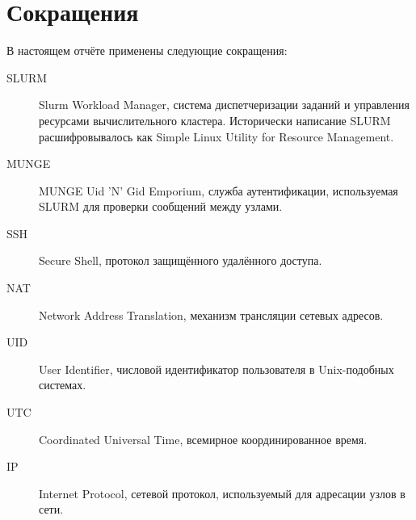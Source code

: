 \section*{Сокращения}

В настоящем отчёте применены следующие сокращения:

\begin{description}
    \item[SLURM] Slurm Workload Manager, система диспетчеризации заданий и управления ресурсами вычислительного кластера. Исторически написание SLURM расшифровывалось как Simple Linux Utility for Resource Management.
    \item[MUNGE] MUNGE Uid 'N' Gid Emporium, служба аутентификации, используемая SLURM для проверки сообщений между узлами.
    \item[SSH] Secure Shell, протокол защищённого удалённого доступа.
    \item[NAT] Network Address Translation, механизм трансляции сетевых адресов.
    \item[UID] User Identifier, числовой идентификатор пользователя в Unix-подобных системах.
    \item[UTC] Coordinated Universal Time, всемирное координированное время.
    \item[IP] Internet Protocol, сетевой протокол, используемый для адресации узлов в сети.
\end{description}

\newpage

